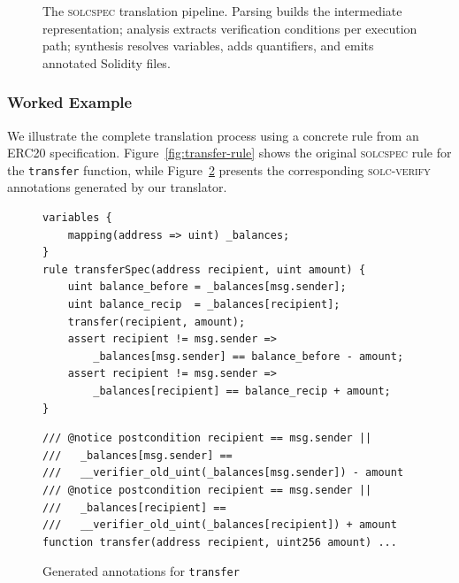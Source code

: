 \begin{figure}[h]
\caption{The \textsc{solcspec} translation pipeline. Parsing builds the intermediate representation; analysis extracts verification conditions per execution path; synthesis resolves variables, adds quantifiers, and emits annotated Solidity files.}
\label{fig:pipeline}
\end{figure}

\subsubsection{Worked Example}

We illustrate the complete translation process using a concrete rule from an ERC20 specification. 
Figure~\ref{fig:transfer-rule} shows the original \textsc{solcspec} rule for the \texttt{transfer} function, while Figure~\ref{fig:transfer-ann} presents the corresponding \textsc{solc-verify} annotations generated by our translator.

\begin{figure}[t]
\centering
\begin{minipage}{0.47\textwidth}
\begin{lstlisting}[style=solstyle]
variables {
    mapping(address => uint) _balances;
}
rule transferSpec(address recipient, uint amount) {
    uint balance_before = _balances[msg.sender];
    uint balance_recip  = _balances[recipient];
    transfer(recipient, amount);
    assert recipient != msg.sender =>
        _balances[msg.sender] == balance_before - amount;
    assert recipient != msg.sender =>
        _balances[recipient] == balance_recip + amount;
}
\end{lstlisting}
\caption{ERC20 transfer rule in \textsc{solcspec}}
\label{fig:transfer-rule}
\end{minipage}
\hfill
\begin{minipage}{0.47\textwidth}
\begin{lstlisting}[style=solstyle]
/// @notice postcondition recipient == msg.sender ||
///   _balances[msg.sender] ==
///   __verifier_old_uint(_balances[msg.sender]) - amount
/// @notice postcondition recipient == msg.sender ||
///   _balances[recipient] ==
///   __verifier_old_uint(_balances[recipient]) + amount
function transfer(address recipient, uint256 amount) ...
\end{lstlisting}
\caption{Generated annotations for \texttt{transfer}}
\label{fig:transfer-ann}
\end{minipage}
\end{figure}

